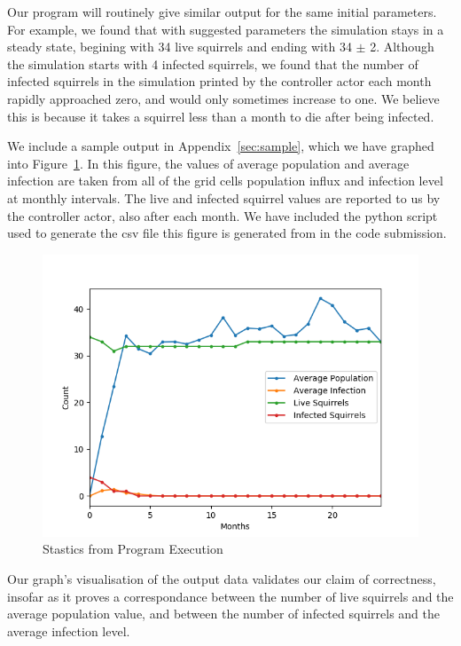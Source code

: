 \documentclass[oneside]{article}
\begin{document}
Our program will routinely give similar output for the same initial parameters. For example, we found that with suggested parameters the simulation stays in a steady state, begining with 34 live squirrels and ending with 34 $\pm$ 2. Although the simulation starts with 4 infected squirrels, we found that the number of infected squirrels in the simulation printed by the controller actor each month rapidly approached zero, and would only sometimes increase to one. We believe this is because it takes a squirrel less than a month to die after being infected.

We include a sample output in Appendix~\ref{sec:sample}, which we have graphed into Figure~\ref{fig:prog-ex}. In this figure, the values of average population and average infection are taken from all of the grid cells population influx and infection level at monthly intervals. The live and infected squirrel values are reported to us by the controller actor, also after each month. We have included the python script used to generate the csv file this figure is generated from in the code submission.
\begin{figure}
  \includegraphics[width=\linewidth]{figures/d1}
  \caption{Stastics from Program Execution}
  \label{fig:prog-ex}
\end{figure}

Our graph's visualisation of the output data validates our claim of correctness, insofar as it proves a correspondance between the number of live squirrels and the average population value, and between the number of infected squirrels and the average infection level.
\end{document}
